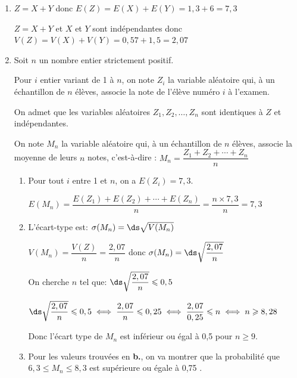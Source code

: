 \begin{enumerate}
\item 
$Z=X+Y$ donc $E(Z)=E(X)+E(Y)= 1,3+6=7,3$

$Z=X+Y$ et $X$ et $Y$ sont indépendantes donc $V(Z)=V(X)+V(Y)=0,57+1,5=2,07$

\item Soit $n$ un nombre entier strictement positif.

Pour $i$ entier variant de 1 à $n$, on note $Z_{i}$ la variable aléatoire qui, à un échantillon de $n$ élèves, associe la note de l'élève numéro $i$ à l'examen.

On admet que les variables aléatoires $Z_{1}, Z_{2}, \ldots, Z_{n}$ sont identiques à $Z$ et indépendantes.

On note $M_{n}$ la variable aléatoire qui, à un échantillon de $n$ élèves, associe la moyenne de leurs $n$ notes, c'est-à-dire :
$M_{n} = \dfrac{Z_{1} + Z_{2} + \cdots + Z_{n}}{n}$

	\begin{enumerate}
		\item 
Pour tout $i$ entre 1 et $n$, on a $E(Z_i)= 7,3$.

$E(M_n)=\dfrac{E(Z_{1}) + E(Z_{2}) + \cdots + E(Z_{n})}{n}
=\dfrac{n\times 7,3}{n} = 7,3$
		

		\item 
L'écart-type est: $\sigma(M_n) = \ds\sqrt{V(M_n)}$

$V(M_n)=\dfrac{V(Z)}{n}=\dfrac{2,07}{n}$ donc $\sigma(M_n) = \ds\sqrt{ \dfrac{2,07}{n}}$

On cherche $n$ tel que: $\ds\sqrt{ \dfrac{2,07}{n}}\leqslant 0,5$

$\ds\sqrt{ \dfrac{2,07}{n}}\leqslant 0,5
\iff \dfrac{2,07}{n} \leqslant 0,25
\iff \dfrac{2,07}{0,25}\leqslant n
\iff n\geqslant 8,28$

Donc l'écart type de $M_{n}$ est inférieur ou égal à 0,5 pour $n\geqslant 9$.

		\item Pour les valeurs trouvées en \textbf{b.}, on va montrer que la probabilité que\\
		 $6,3 \leqslant M_{n} \leqslant 8,3$ est supérieure ou égale à 0,75 .

\end{enumerate}
\end{enumerate}
